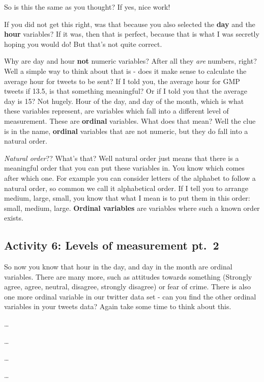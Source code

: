 \documentclass[
]{book}
\begin{document}
So is this the same as you thought? If yes, nice work!

If you did not get this right, was that because you also selected the \textbf{day} and the \textbf{hour} variables? If it was, then that is perfect, because that is what I was secretly hoping you would do! But that's not quite correct.

Why are day and hour \textbf{not} numeric variables? After all they \emph{are} numbers, right? Well a simple way to think about that is - does it make sense to calculate the average hour for tweets to be sent? If I told you, the average hour for GMP tweets if 13.5, is that something meaningful? Or if I told you that the average day is 15? Not hugely. Hour of the day, and day of the month, which is what these variables represent, are variables which fall into a different level of measurement. These are \textbf{ordinal} variables. What does that mean? Well the clue is in the name, \textbf{ordinal} variables that are not numeric, but they do fall into a natural order.

\emph{Natural order}?? What's that? Well natural order just means that there is a meaningful order that you can put these variables in. You know which comes after which one. For example you can consider letters of the alphabet to follow a natural order, so common we call it alphabetical order. If I tell you to arrange medium, large, small, you know that what I mean is to put them in this order: small, medium, large. \textbf{Ordinal variables} are variables where such a known order exists.

\hypertarget{activity-6-levels-of-measurement-pt.-2}{%
\subsection{Activity 6: Levels of measurement pt.~2}\label{activity-6-levels-of-measurement-pt.-2}}

So now you know that hour in the day, and day in the month are ordinal variables. There are many more, such as attitudes towards something (Strongly agree, agree, neutral, disagree, strongly disagree) or fear of crime. There is also one more ordinal variable in our twitter data set - can you find the other ordinal variables in your tweets data? Again take some time to think about this.

\ldots{}

\ldots{}

\ldots{}

\ldots{}
\end{document}
